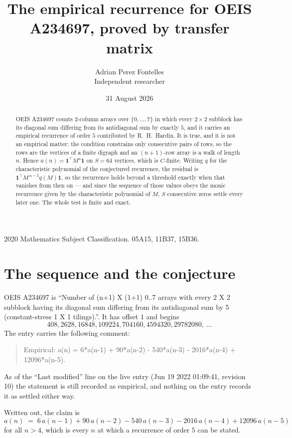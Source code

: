 \documentclass[11pt,a4paper]{article}
\title{The empirical recurrence for OEIS A234697, proved by transfer matrix}
\author{Adrian Perez Fontelles\\ \small Independent researcher}
\date{31 August 2026}
\theoremstyle{plain}
\theoremstyle{definition}
\begin{document}
\maketitle

\begin{abstract}
OEIS A234697 counts $2$-column arrays over $\{0,\dots,7\}$ in which every
$2\times2$ subblock has its diagonal sum differing from its antidiagonal sum by
exactly $5$, and it
carries an empirical recurrence of order $5$ contributed by R.~H.~Hardin. It is true,
and it is not an empirical matter: the condition constrains only consecutive pairs of rows,
so the rows are the vertices of a finite digraph and an $(n+1)$-row array is a walk of
length $n$. Hence $a(n)=\mathbf{1}^{\!\top}M^{n}\mathbf{1}$ on $S=64$ vertices, which
is $C$-finite. Writing $q$ for the characteristic polynomial of the conjectured recurrence,
the residual is $\mathbf{1}^{\!\top}M^{\,n-5}q(M)\mathbf{1}$, so the recurrence
holds beyond a threshold exactly when that vanishes from then on --- and since the sequence
of those values obeys the monic recurrence given by the characteristic polynomial of $M$,
$S$ consecutive zeros settle every later one. The whole test is finite and exact.
\end{abstract}

\noindent\small 2020 Mathematics Subject Classification. 05A15, 11B37, 15B36.\normalsize

\section{The sequence and the conjecture}

OEIS A234697 is ``Number of (n+1) X (1+1) 0..7 arrays with every 2 X 2 subblock having its diagonal sum differing from its antidiagonal sum by 5 (constant-stress 1 X 1 tilings).''. It has offset
$1$ and begins
\[
408, 2628, 16848, 109224, 704160, 4594320, 29782080,\ \dots
\]
The entry carries the following comment:
\begin{quote}\small
Empirical: a(n) = 6*a(n-1) + 90*a(n-2) - 540*a(n-3) - 2016*a(n-4) + 12096*a(n-5).
\end{quote}
As of the ``Last modified'' line on the live entry (Jun 19 2022 01:09:41, revision 10) the statement is
still recorded as empirical, and nothing on the entry records it as settled either way.

Written out, the claim is
\begin{equation}\label{eq:conj}
a(n)\;=\;6\,a(n-1) + 90\,a(n-2) - 540\,a(n-3) - 2016\,a(n-4) + 12096\,a(n-5)
\end{equation}
for all $n>4$, which is every $n$ at which a recurrence of order $5$ can be
stated.
\end{document}

